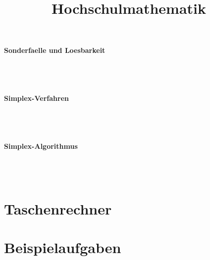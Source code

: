 \documentclass[a4paper]{article} %
\begin{document}
	\paragraph{Sonderfaelle und Loesbarkeit}
	 \hspace{0 cm} \\ \noindent \\
	\paragraph{Simplex-Verfahren}
	 \hspace{0 cm} \\ \noindent \\
	\paragraph{Simplex-Algorithmus}
	 \hspace{0 cm} \\ \noindent \\
	\section{Taschenrechner}
	\section{Beispielaufgaben}


	\title{Hochschulmathematik}
	\date{} %
	\maketitle
	\newpage
	
	
\end{document}
